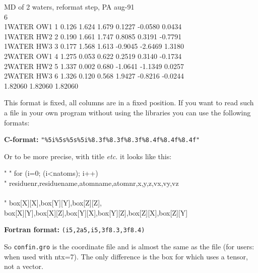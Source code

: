 \begin{tt}
MD of 2 waters, reformat step, PA aug-91\\
    6\\
    1WATER  OW1    1   0.126   1.624   1.679  0.1227 -0.0580  0.0434\\
    1WATER  HW2    2   0.190   1.661   1.747  0.8085  0.3191 -0.7791\\
    1WATER  HW3    3   0.177   1.568   1.613 -0.9045 -2.6469  1.3180\\
    2WATER  OW1    4   1.275   0.053   0.622  0.2519  0.3140 -0.1734\\
    2WATER  HW2    5   1.337   0.002   0.680 -1.0641 -1.1349  0.0257\\
    2WATER  HW3    6   1.326   0.120   0.568  1.9427 -0.8216 -0.0244\\
   1.82060   1.82060   1.82060\\
\end{tt}

This format is fixed, {\ie} all columns are in a fixed position. If you
want to read such a file in your own program without using the
{\gromacs} libraries you can use the following formats:

{\bf C-format:} \verb'"%5i%5s%5s%5i%8.3f%8.3f%8.3f%8.4f%8.4f%8.4f"'

Or to be more precise, with title {\em etc.} it looks like this:

\begin{tt}
  "%
  "%
  for (i=0; (i<natoms); i++) {\\
    "%
      residuenr,residuename,atomname,atomnr,x,y,z,vx,vy,vz\\
  }\\
  "%
    box[X][X],box[Y][Y],box[Z][Z],\\
    box[X][Y],box[X][Z],box[Y][X],box[Y][Z],box[Z][X],box[Z][Y]\\
\end{tt}

{\bf Fortran format:} {\tt (i5,2a5,i5,3f8.3,3f8.4)}

So {\tt confin.gro} is the {\gromacs} coordinate file and is almost
the same as the  file (for {\gromos} users: when used with
ntx=7).  The only difference is the box for which {\gromacs} uses a
tensor, not a vector.

